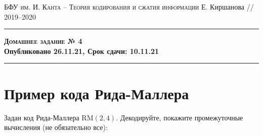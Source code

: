 \documentclass[11pt]{exam}
\theoremstyle{definition}
\begin{document}
	{\noindent
	\textsc{БФУ им. И. Канта -- Теория кодирования и сжатия информации}
	\hfill {Е. Киршанова // 2019--2020\\}
	\hrule
	\begin{center}
		{\Large\textbf{
				\textsc{Домашнее задание № 4} \\[5pt] {Опубликовано 26.11.21, Срок сдачи: 10.11.21}
		} } 
	\end{center}
	\hrule \vspace{5mm}
	
	\thispagestyle{empty}
	
	\vspace{0.2cm}
	
 		
 
\section{Пример кода Рида-Маллера}

\begin{questions}
	\question Задан код Рида-Маллера $\mathrm{RM}(2,4)$. Декодируйте, покажите промежуточные вычисления (не обязательно все):
	

\end{questions}}
\end{document}
